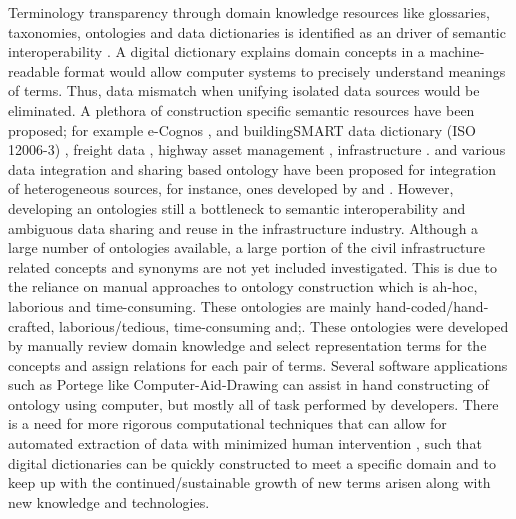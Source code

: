 \documentclass[Journal,InsideFigs, DoubleSpace]{ascelike} %
\begin{document}
%
Terminology transparency through domain knowledge resources like glossaries, taxonomies, ontologies and data dictionaries is identified as an driver of semantic interoperability \cite{ouksel99}. A digital dictionary explains domain concepts in a machine-readable format would allow computer systems to precisely understand meanings of terms. Thus, data mismatch when unifying isolated data sources would be eliminated. A plethora of construction specific semantic resources have been proposed; for example e-Cognos \cite{wetherill02}, and buildingSMART data dictionary (ISO 12006-3) \cite{buildingsmartData}, freight data \cite{seedah15}, highway asset management \cite{el-diraby05}, infrastructure \cite{osman06}. and various data integration and sharing based ontology have been proposed for integration of heterogeneous sources, for instance, ones developed by \cite{buitelaar08} and \cite{seng09}. However, developing an ontologies still a bottleneck to semantic interoperability and ambiguous data sharing and reuse in the infrastructure industry. Although a large number of ontologies available, a large portion of the civil infrastructure related concepts and synonyms are not yet included investigated. This is due to the reliance on manual approaches to ontology construction which is ah-hoc, laborious and time-consuming. These ontologies are mainly hand-coded/hand-crafted, laborious/tedious, time-consuming and;. These ontologies were developed by manually review domain knowledge and select representation terms for the concepts and assign relations for each pair of terms. Several software applications such as Portege like Computer-Aid-Drawing can assist in hand constructing of ontology using computer, but mostly all of task performed by developers. There is a need for more rigorous computational techniques that can allow for automated extraction of data with minimized human intervention \cite{mounce10}, such that digital dictionaries can be quickly constructed to meet a specific domain and to keep up with the continued/sustainable growth of new terms arisen along with new knowledge and technologies.
\par
\end{document}
